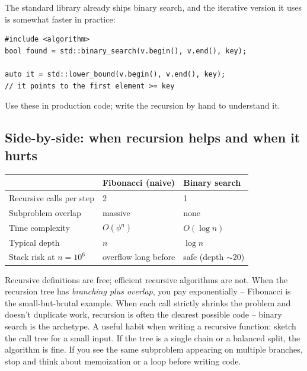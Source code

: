 \documentclass[11pt]{article}
\begin{document}
\begin{notebox}
The standard library already ships binary search, and the iterative
version it uses is somewhat faster in practice:
\begin{verbatim}
#include <algorithm>
bool found = std::binary_search(v.begin(), v.end(), key);

auto it = std::lower_bound(v.begin(), v.end(), key);
// it points to the first element >= key
\end{verbatim}
Use these in production code; write the recursion by hand to
understand it.
\end{notebox}

\subsection{Side-by-side: when recursion helps and when it hurts}

\begin{center}
\small
\begin{tabular}{lll}
& \textbf{Fibonacci (naive)} & \textbf{Binary search} \\
\hline
Recursive calls per step & 2 & 1 \\
Subproblem overlap & massive & none \\
Time complexity & $O(\phi^n)$ & $O(\log n)$ \\
Typical depth & $n$ & $\log n$ \\
Stack risk at $n = 10^6$ & overflow long before & safe (depth $\sim 20$) \\
\end{tabular}
\normalsize
\end{center}

\begin{ideabox}
Recursive definitions are free; efficient recursive algorithms are
not. When the recursion tree has \emph{branching plus overlap}, you
pay exponentially -- Fibonacci is the small-but-brutal example.
When each call strictly shrinks the problem and doesn't duplicate
work, recursion is often the clearest possible code -- binary search
is the archetype. A useful habit when writing a recursive function:
sketch the call tree for a small input. If the tree is a single
chain or a balanced split, the algorithm is fine. If you see the
same subproblem appearing on multiple branches, stop and think about
memoization or a loop before writing code.
\end{ideabox}
\end{document}
